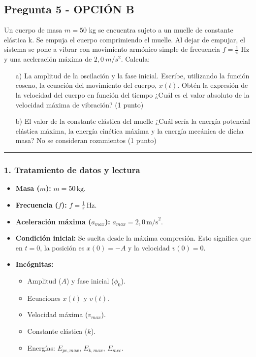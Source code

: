 \newpage
\subsection{Pregunta 5 - OPCIÓN B}
\label{subsec:5B_2025_jul_ext}

\begin{cajaenunciado}
Un cuerpo de masa $m=50$ kg se encuentra sujeto a un muelle de constante elástica k. Se empuja el cuerpo comprimiendo el muelle. Al dejar de empujar, el sistema se pone a vibrar con movimiento armónico simple de frecuencia $f=\frac{1}{\pi}$ Hz y una aceleración máxima de $2,0~m/s^{2}$. Calcula:
\begin{enumerate}
    \item[a)] La amplitud de la oscilación y la fase inicial. Escribe, utilizando la función coseno, la ecuación del movimiento del cuerpo, $x(t)$. Obtén la expresión de la velocidad del cuerpo en función del tiempo ¿Cuál es el valor absoluto de la velocidad máxima de vibración? (1 punto)
    \item[b)] El valor de la constante elástica del muelle ¿Cuál sería la energía potencial elástica máxima, la energía cinética máxima y la energía mecánica de dicha masa? No se consideran rozamientos (1 punto)
\end{enumerate}
\end{cajaenunciado}
\hrule

\subsubsection*{1. Tratamiento de datos y lectura}
\begin{itemize}
    \item \textbf{Masa ($m$):} $m = 50 \, \text{kg}$.
    \item \textbf{Frecuencia ($f$):} $f = \frac{1}{\pi} \, \text{Hz}$.
    \item \textbf{Aceleración máxima ($a_{max}$):} $a_{max} = 2,0 \, \text{m/s}^2$.
    \item \textbf{Condición inicial:} Se suelta desde la máxima compresión. Esto significa que en $t=0$, la posición es $x(0)=-A$ y la velocidad $v(0)=0$.
    \item \textbf{Incógnitas:}
        \begin{itemize}
        \item Amplitud ($A$) y fase inicial ($\phi_0$).
        \item Ecuaciones $x(t)$ y $v(t)$.
        \item Velocidad máxima ($v_{max}$).
        \item Constante elástica ($k$).
        \item Energías: $E_{pe,max}$, $E_{k,max}$, $E_{mec}$.
    \end{itemize}
\end{itemize}

